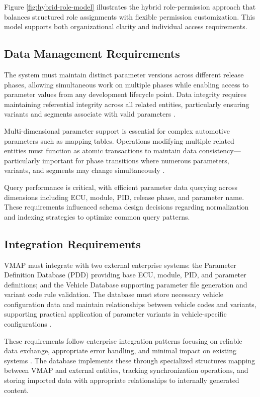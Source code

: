 Figure \ref{fig:hybrid-role-model} illustrates the hybrid role-permission approach that balances structured role assignments with flexible permission customization. This model supports both organizational clarity and individual access requirements.

\subsection{Data Management Requirements}
\label{subsec:data-management-requirements}

The system must maintain distinct parameter versions across different release phases, allowing simultaneous work on multiple phases while enabling access to parameter values from any development lifecycle point. Data integrity requires maintaining referential integrity across all related entities, particularly ensuring variants and segments associate with valid parameters \cite{elmasri2015fundamentals}.

Multi-dimensional parameter support is essential for complex automotive parameters such as mapping tables. Operations modifying multiple related entities must function as atomic transactions to maintain data consistency—particularly important for phase transitions where numerous parameters, variants, and segments may change simultaneously \cite{bhattacherjee2015principles}.

Query performance is critical, with efficient parameter data querying across dimensions including ECU, module, PID, release phase, and parameter name. These requirements influenced schema design decisions regarding normalization and indexing strategies to optimize common query patterns.

\subsection{Integration Requirements}
\label{subsec:integration-requirements}

VMAP must integrate with two external enterprise systems: the Parameter Definition Database (PDD) providing base ECU, module, PID, and parameter definitions; and the Vehicle Database supporting parameter file generation and variant code rule validation. The database must store necessary vehicle configuration data and maintain relationships between vehicle codes and variants, supporting practical application of parameter variants in vehicle-specific configurations \cite{staron2021automotive}.

These requirements follow enterprise integration patterns focusing on reliable data exchange, appropriate error handling, and minimal impact on existing systems \cite{hohpe2002enterprise}. The database implements these through specialized structures mapping between VMAP and external entities, tracking synchronization operations, and storing imported data with appropriate relationships to internally generated content.

